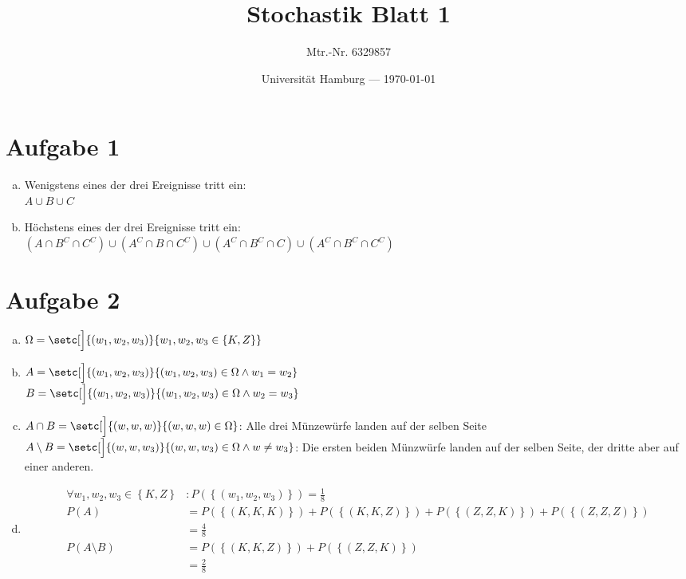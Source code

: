 \documentclass[parskip=half,a4paper]{scrartcl}
\title{Stochastik Blatt 1}
\author{Mtr.-Nr. 6329857}
\date{Universität Hamburg --- \today}
\begin{document}
\maketitle

\section*{Aufgabe 1}

\begin{enumerate}[(a)]
\item Wenigstens eines der drei Ereignisse tritt ein:\\ $A \cup B \cup C$
\item Höchstens eines der drei Ereignisse tritt ein:\\ $
(A \cap B^C \cap C^C) \cup
(A^C \cap B \cap C^C) \cup
(A^C \cap B^C \cap C) \cup
(A^C \cap B^C \cap C^C)
$
\end{enumerate}

\section*{Aufgabe 2}

\begin{enumerate}[(a)]
\item $\Omega = \setc[\Big]{ (w_1, w_2, w_3)}{w_1,w_2,w_3 \in \left\{K,Z\right\}}$

\item $A = \setc[\Big]{ (w_1, w_2, w_3)}{(w_1,w_2,w_3) \in \Omega \land w_1 = w_2}$ \\ $B = \setc[\Big]{ (w_1, w_2, w_3)}{(w_1,w_2,w_3) \in \Omega \land w_2 = w_3}$

\item $A \cap B = \setc[\Big]{ (w, w, w)}{(w,w,w) \in \Omega}$: Alle drei Münzewürfe landen auf der selben Seite \\
$A \setminus B = \setc[\Big]{ (w, w, w_3)}{(w,w,w_3) \in \Omega \land w \neq w_3}$: Die ersten beiden Münzwürfe landen auf der selben Seite, der dritte aber auf einer anderen.

\item
\begin{align*}
\forall w_1,w_2,w_3 \in \left\{K, Z\right\}&:
P\left(\left\{\left(w_1, w_2, w_3\right)\right\}\right) = \frac{1}{8}\\
P\left(A\right) &= P\left(\left\{\left(K,K,K\right)\right\}\right) + P\left(\left\{\left(K,K,Z\right)\right\}\right) + P\left(\left\{\left(Z,Z,K\right)\right\}\right) + P\left(\left\{\left(Z,Z,Z\right)\right\}\right) \\&= \frac{4}{8}\\
P\left(A \setminus B\right) &= P\left(\left\{\left(K,K,Z\right)\right\}\right) + P\left(\left\{\left(Z,Z,K\right)\right\}\right) \\&= \frac{2}{8}
\end{align*}


\end{enumerate}
\end{document}
